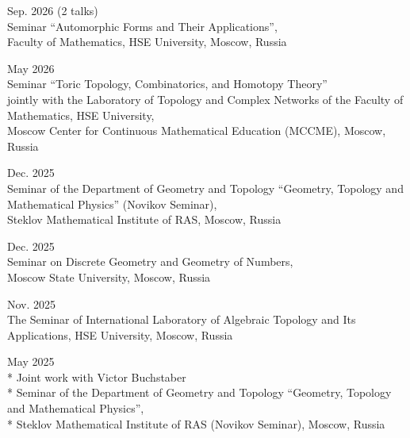 \documentclass[11pt,letterpaper]{report}
\begin{document}
      \begin{tablist}

      \item{Sep. 2026}  (2 talks)\\ Seminar ``Automorphic Forms and Their Applications'',\\ Faculty of Mathematics, HSE University, Moscow, Russia
      
      \item{May 2026} \\ Seminar ``Toric Topology, Combinatorics, and Homotopy Theory''\\ jointly with the Laboratory of Topology and Complex Networks of the Faculty of Mathematics, HSE University,\\ Moscow Center for Continuous Mathematical Education (MCCME), Moscow, Russia
      
      \item{Dec. 2025}	\\ Seminar of the Department of Geometry and Topology ``Geometry, Topology and Mathematical Physics'' (Novikov Seminar),\\ Steklov Mathematical Institute of RAS, Moscow, Russia
    
      \item{Dec. 2025} \\ Seminar on Discrete Geometry and Geometry of Numbers,\\ Moscow State University, Moscow, Russia
      
      \item{Nov. 2025} \\ The Seminar of International Laboratory of Algebraic Topology and Its Applications, HSE University, Moscow, Russia
      
      \item{May 2025} \\* Joint work with Victor Buchstaber\\* Seminar of the Department of Geometry and Topology ``Geometry, Topology and Mathematical Physics'',\\* Steklov Mathematical Institute of RAS (Novikov Seminar), Moscow, Russia
      

\end{tablist}
\end{document}
